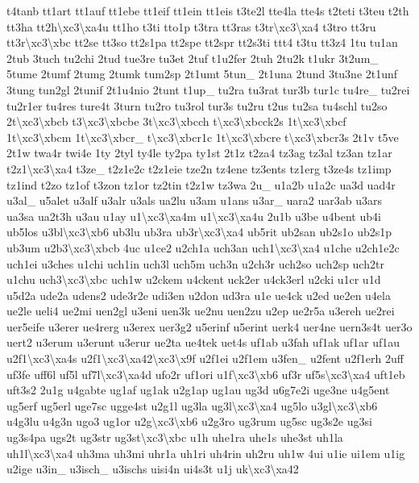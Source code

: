 \begin{DoxyCompactItemize}
t4tanb tt1art tt1auf tt1ebe tt1eif tt1ein tt1eis t3te2l tte4la tte4s t2teti t3teu t2th tt3ha tt2h\textbackslash{}xc3\textbackslash{}xa4u tt1ho t3ti tto1p t3tra tt3ras t3tr\textbackslash{}xc3\textbackslash{}xa4 t3tro tt3ru tt3r\textbackslash{}xc3\textbackslash{}xbc tt2se tt3so tt2s1pa tt2spe tt2spr tt2s3ti ttt4 t3tu tt3z4 1tu tu1an 2tub 3tuch tu2chi 2tud tue3re tu3et 2tuf t1u2fer 2tuh 2tu2k t1ukr 3t2um\-\_\- 5tume 2tumf 2tumg 2tumk tum2sp 2t1umt 5tun\-\_\- 2t1una 2tund 3tu3ne 2t1unf 3tung tun2gl 2tunif 2t1u4nio 2tunt t1up\-\_\- tu2ra tu3rat tur3b tur1c tu4re\-\_\- tu2rei tu2r1er tu4res ture4t 3turn tu2ro tu3rol tur3s tu2ru t2us tu2sa tu4schl tu2so 2t\textbackslash{}xc3\textbackslash{}xbcb t3\textbackslash{}xc3\textbackslash{}xbcbe 3t\textbackslash{}xc3\textbackslash{}xbcch t\textbackslash{}xc3\textbackslash{}xbcck2s 1t\textbackslash{}xc3\textbackslash{}xbcf 1t\textbackslash{}xc3\textbackslash{}xbcm 1t\textbackslash{}xc3\textbackslash{}xbcr\-\_\- t\textbackslash{}xc3\textbackslash{}xbcr1c 1t\textbackslash{}xc3\textbackslash{}xbcre t\textbackslash{}xc3\textbackslash{}xbcr3s 2t1v t5ve 2t1w twa4r twi4e 1ty 2tyl ty4le ty2pa ty1st 2t1z t2za4 tz3ag tz3al tz3an tz1ar t2z1\textbackslash{}xc3\textbackslash{}xa4 t3ze\-\_\- t2z1e2c t2z1eie tze2n tz4ene tz3ents tz1erg t3ze4s tz1imp tz1ind t2zo tz1of t3zon tz1or tz2tin t2z1w tz3wa 2u\-\_\- u1a2b u1a2c ua3d uad4r u3al\-\_\- u5alet u3alf u3alr u3als ua2lu u3am u1ans u3ar\-\_\- uara2 uar3ab u3ars ua3sa ua2t3h u3au u1ay u1\textbackslash{}xc3\textbackslash{}xa4m u1\textbackslash{}xc3\textbackslash{}xa4u 2u1b u3be u4bent ub4i ub5los u3bl\textbackslash{}xc3\textbackslash{}xb6 ub3lu ub3ra ub3r\textbackslash{}xc3\textbackslash{}xa4 ub5rit ub2san ub2s1o ub2s1p ub3um u2b3\textbackslash{}xc3\textbackslash{}xbcb 4uc u1ce2 u2ch1a uch3an uch1\textbackslash{}xc3\textbackslash{}xa4 u1che u2ch1e2c uch1ei u3ches u1chi uch1in uch3l uch5m uch3n u2ch3r uch2so uch2sp uch2tr u1chu uch3\textbackslash{}xc3\textbackslash{}xbc uch1w u2ckem u4ckent uck2er u4ck3erl u2cki u1cr u1d u5d2a ude2a udens2 ude3r2e udi3en u2don ud3ra u1e ue4ck u2ed ue2en u4ela ue2le ueli4 ue2mi uen2gl u3eni uen3k ue2nu uen2zu u2ep ue2r5a u3ereh ue2rei uer5eife u3erer ue4rerg u3erex uer3g2 u5erinf u5erint uerk4 uer4ne uern3s4t uer3o uert2 u3erum u3erunt u3erur ue2ta ue4tek uet4s uf1ab u3fah uf1ak uf1ar uf1au u2f1\textbackslash{}xc3\textbackslash{}xa4s u2f1\textbackslash{}xc3\textbackslash{}xa42\textbackslash{}xc3\textbackslash{}x9f u2f1ei u2f1em u3fen\-\_\- u2fent u2f1erh 2uff uf3fe uff6l uf5l uf7l\textbackslash{}xc3\textbackslash{}xa4d ufo2r uf1ori u1f\textbackslash{}xc3\textbackslash{}xb6 uf3r uf5s\textbackslash{}xc3\textbackslash{}xa4 uft1eb uft3s2 2u1g u4gabte ug1af ug1ak u2g1ap ug1au ug3d u6g7e2i uge3ne u4g5ent ug5erf ug5erl uge7sc ugge4st u2g1l ug3la ug3l\textbackslash{}xc3\textbackslash{}xa4 ug5lo u3gl\textbackslash{}xc3\textbackslash{}xb6 u4g3lu u4g3n ugo3 ug1or u2g\textbackslash{}xc3\textbackslash{}xb6 u2g3ro ug3rum ug5sc ug3s2e ug3si ug3s4pa ugs2t ug3str ug3st\textbackslash{}xc3\textbackslash{}xbc u1h uhe1ra uhe1s uhe3st uh1la uh1l\textbackslash{}xc3\textbackslash{}xa4 uh3ma uh3mi uhr1a uh1ri uh4rin uh2ru uh1w 4ui u1ie ui1em u1ig u2ige u3in\-\_\- u3isch\-\_\- u3ischs uisi4n ui4s3t u1j uk\textbackslash{}xc3\textbackslash{}xa42 
\end{DoxyCompactItemize}

